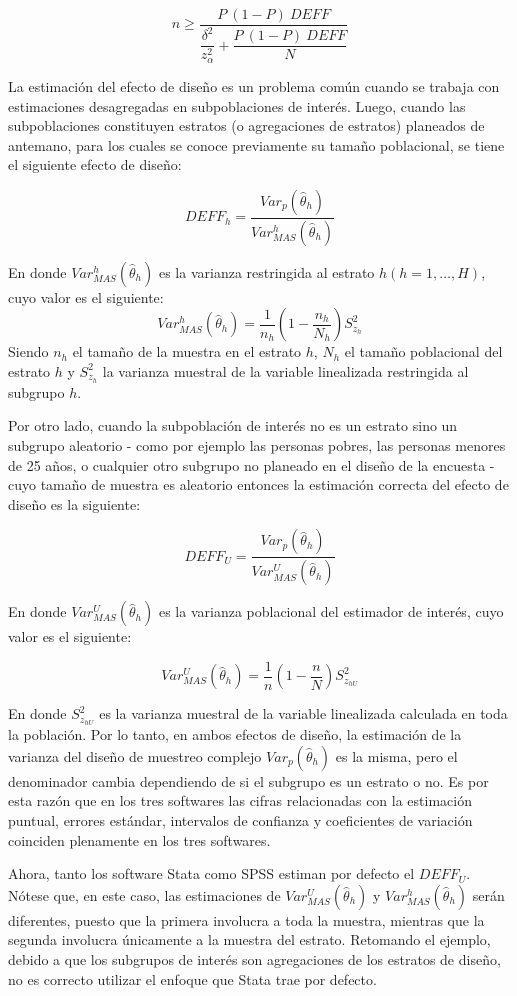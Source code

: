 \documentclass[
  12pt,
  spanish,
]{book}
\begin{document}
\[ 
n \geq \dfrac{P\ (1-P)\ DEFF}{\dfrac{\delta^2}{z_{\alpha}^2 }+\dfrac{P\ (1-P) \ DEFF}{N}}
\]

La estimación del efecto de diseño es un problema común cuando se trabaja con estimaciones desagregadas en subpoblaciones de interés. Luego, cuando las subpoblaciones constituyen estratos (o agregaciones de estratos) planeados de antemano, para los cuales se conoce previamente su tamaño poblacional, se tiene el siguiente efecto de diseño:

\[
DEFF_h= \frac{Var_p (\hat\theta_h) }{Var_{MAS}^h(\hat\theta_h) }
\]

En donde \(Var_{MAS}^h(\hat\theta_h)\) es la varianza restringida al estrato \(h (h=1,\ldots, H)\), cuyo valor es el siguiente:
\[
Var_{MAS}^h(\hat\theta_h)=\frac{1}{n_h}\left(1-\frac{n_h}{N_h}\right)S_{z_h}^2
\]
Siendo \(n_h\) el tamaño de la muestra en el estrato \(h\), \(N_h\) el tamaño poblacional del estrato \(h\) y \(S_{z_h}^2\) la varianza muestral de la variable linealizada restringida al subgrupo \(h\).

Por otro lado, cuando la subpoblación de interés no es un estrato sino un subgrupo aleatorio - como por ejemplo las personas pobres, las personas menores de 25 años, o cualquier otro subgrupo no planeado en el diseño de la encuesta - cuyo tamaño de muestra es aleatorio entonces la estimación correcta del efecto de diseño es la siguiente:

\[
DEFF_U= \frac{Var_p (\hat\theta_h) }{Var_{MAS}^U(\hat\theta_h) }
\]

En donde \(Var_{MAS}^U(\hat\theta_h)\) es la varianza poblacional del estimador de interés, cuyo valor es el siguiente:

\[
Var_{MAS}^U(\hat\theta_h)=\frac{1}{n}\left(1-\frac{n}{N}\right)S_{z_{hU}}^2
\]

En donde \(S_{z_{hU}}^2\) es la varianza muestral de la variable linealizada calculada en toda la población. Por lo tanto, en ambos efectos de diseño, la estimación de la varianza del diseño de muestreo complejo \(Var_p (\hat\theta_h)\) es la misma, pero el denominador cambia dependiendo de si el subgrupo es un estrato o no. Es por esta razón que en los tres softwares las cifras relacionadas con la estimación puntual, errores estándar, intervalos de confianza y coeficientes de variación coinciden plenamente en los tres softwares.

Ahora, tanto los software Stata como SPSS estiman por defecto el \(DEFF_U\). Nótese que, en este caso, las estimaciones de \(Var_{MAS}^U(\hat\theta_h)\) y \(Var_{MAS}^h(\hat\theta_h)\) serán diferentes, puesto que la primera involucra a toda la muestra, mientras que la segunda involucra únicamente a la muestra del estrato. Retomando el ejemplo, debido a que los subgrupos de interés son agregaciones de los estratos de diseño, no es correcto utilizar el enfoque que Stata trae por defecto.
\end{document}
